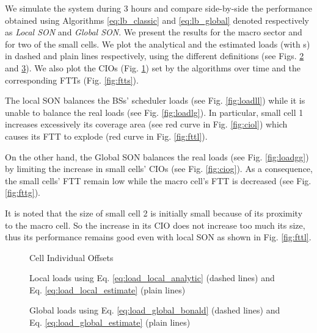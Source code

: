 \documentclass[10pt,draftclsnofoot,onecolumn]{IEEEtran}
\begin{document}
    We simulate the system during 3 hours and compare
side-by-side the performance obtained using Algorithms
\eqref{eq:lb_classic} and \eqref{eq:lb_global}
denoted respectively as \textit{Local SON} and
\textit{Global SON}. We present the results for the macro sector and for
two of the small cells. We plot the analytical and the
estimated loads (with s) in dashed and plain lines respectively,
using the different definitions (see Figs. \ref{fig:loadsl}
and \ref{fig:loadsg}). We also plot the \acp{CIO} (Fig. \ref{fig:cios})
set by the algorithms over time and the corresponding \acp{FTT} (Fig. \ref{fig:ftts}).

    The local SON balances the \acp{BS}'
scheduler loads (see Fig. \ref{fig:loadll}) while it is unable
to balance the real loads (see Fig. \ref{fig:loadlg}).
In particular, small cell 1 increases excessively its coverage
area (see red curve in Fig. \ref{fig:ciol}) which causes its
\ac{FTT} to explode (red curve in Fig. \ref{fig:fttl}).

    On the other hand, the Global SON balances the real
loads (see Fig. \ref{fig:loadgg}) by limiting the increase in
small cells' \acp{CIO} (see Fig. \ref{fig:ciog}). As a consequence,
the small cells' \ac{FTT} remain low
while the macro cell's \ac{FTT} is decreased
(see Fig. \ref{fig:fttg}).

It is noted that the size of small cell 2 is initially small because of
its proximity to the macro cell. So the increase in its \ac{CIO}
does not increase too much its size, thus its performance
remains good even with local SON as shown in Fig. \ref{fig:fttl}.


\begin{figure}[ht]
\centering
{}
\quad
{}
\caption{Cell Individual Offsets}
\label{fig:cios}
\end{figure}


\begin{figure}[ht]
\centering
{}
\quad
{}
\caption{Local loads using Eq. \eqref{eq:load_local_analytic} (dashed lines) and Eq. \eqref{eq:load_local_estimate} (plain lines)}
\label{fig:loadsl}
\end{figure}


\begin{figure}[ht]
\centering
{}
\quad
{}
\caption{Global loads using Eq. \eqref{eq:load_global_bonald} (dashed lines) and  Eq. \eqref{eq:load_global_estimate} (plain lines)} \label{fig:loadsg}
\end{figure}
\end{document}
